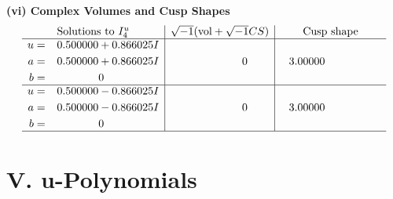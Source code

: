 \documentclass[1p]{elsarticle_modified}
\theoremstyle{definition}
\newcommand{\I}{\sqrt{-1}}
\begin{document}
\newpage\flushleft \textbf{(vi) Complex Volumes and Cusp Shapes}
$$\begin{array}{c|c|c}  
\text{Solutions to }I^u_{4}& \I (\text{vol} + \sqrt{-1}CS) & \text{Cusp shape}\\
 \hline 
\begin{aligned}
u &= \phantom{-}0.500000 + 0.866025 I \\
a &= \phantom{-}0.500000 + 0.866025 I \\
b &= \phantom{-0.000000 } 0\end{aligned}
 & \phantom{-0.000000 } 0 & \phantom{-}3.00000\phantom{ +0.000000I} \\ \hline\begin{aligned}
u &= \phantom{-}0.500000 - 0.866025 I \\
a &= \phantom{-}0.500000 - 0.866025 I \\
b &= \phantom{-0.000000 } 0\end{aligned}
 & \phantom{-0.000000 } 0 & \phantom{-}3.00000\phantom{ +0.000000I}\\
 \hline 
 \end{array}$$\newpage
\newpage\renewcommand{\arraystretch}{1}
\centering \section*{ V. u-Polynomials}
\end{document}
